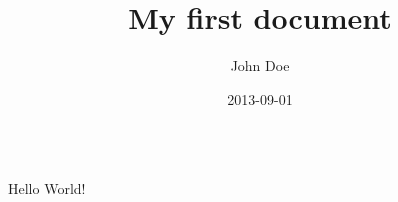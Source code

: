 \documentclass{article}
\title{My first document}
\date{2013-09-01}
\author{John Doe}
\begin{document}
\begin{verbatim}
\end{verbatim}

  \maketitle
  \newpage

  Hello World!

  \inputminted[linenos, breaklines, breakbytoken, tabsize=4]{mysql}{../sql/script.sql}
\end{document}
